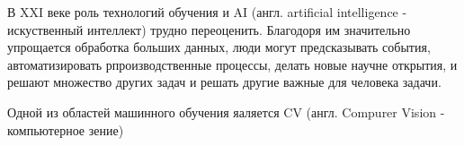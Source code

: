 
В XXI веке роль технологий обучения и AI (англ. artificial intelligence - искуственный интеллект) трудно переоценить.
Благодоря им значительно упрощается обработка больших данных, люди могут предсказывать события, автоматизировать рпроизводственные процессы, делать новые научне открытия, и решают множество других задач и решать другие важные для человека задачи.

Одной из областей машинного обучения яаляется CV (англ. Compurer Vision - компьютерное зение)

\clearpage